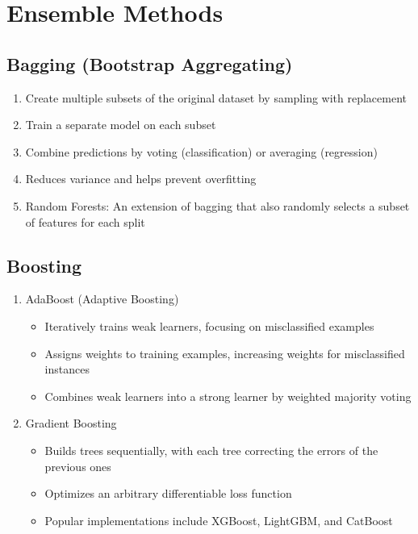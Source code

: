 \documentclass{article}
\begin{document}
\section{Ensemble Methods}

\subsection{Bagging (Bootstrap Aggregating)}
\begin{enumerate}
    \item Create multiple subsets of the original dataset by sampling with replacement
    \item Train a separate model on each subset
    \item Combine predictions by voting (classification) or averaging (regression)
    \item Reduces variance and helps prevent overfitting
    \item Random Forests: An extension of bagging that also randomly selects a subset of features for each split
\end{enumerate}

\subsection{Boosting}
\begin{enumerate}
    \item AdaBoost (Adaptive Boosting)
    \begin{itemize}
        \item Iteratively trains weak learners, focusing on misclassified examples
        \item Assigns weights to training examples, increasing weights for misclassified instances
        \item Combines weak learners into a strong learner by weighted majority voting
    \end{itemize}
    
    \item Gradient Boosting
    \begin{itemize}
        \item Builds trees sequentially, with each tree correcting the errors of the previous ones
        \item Optimizes an arbitrary differentiable loss function
        \item Popular implementations include XGBoost, LightGBM, and CatBoost
    \end{itemize}
\end{enumerate}
\end{document}

